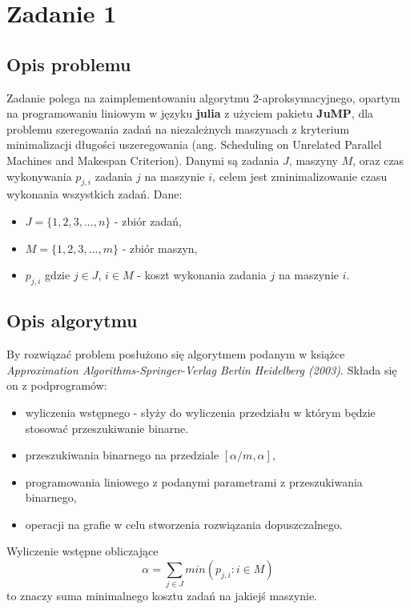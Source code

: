 \chapter{Zadanie 1}
\thispagestyle{chapterBeginStyle}
\label{rozdzial1}

\section{Opis problemu}
Zadanie polega na zaimplementowaniu algorytmu 2-aproksymacyjnego, opartym na programowaniu liniowym w języku \textbf{julia} z użyciem pakietu
\textbf{JuMP}, dla problemu szeregowania zadań na niezależnych maszynach z kryterium minimalizacji długości uszeregowania
(ang.  Scheduling on Unrelated Parallel Machines and Makespan Criterion). Danymi są 
zadania $J$, maszyny $M$, oraz czas wykonywania $p_{j,i}$ zadania $j$ na maszynie $i$, celem jest 
zminimalizowanie czasu wykonania wszystkich zadań.
Dane:
\begin{itemize}
    \item $J = \{1,2,3,...,n\}$ - zbiór zadań,
    \item $M = \{1,2,3,...,m\}$ - zbiór maszyn,
    \item $p_{j,i}$ gdzie $j \in J$, $i \in M$ - koszt wykonania zadania $j$ na maszynie $i$.
\end{itemize}

\section{Opis algorytmu}
By rozwiązać problem posłużono się algorytmem podanym w książce \textit{Approximation Algorithms-Springer-Verlag Berlin Heidelberg (2003)}.
Składa się on z podprogramów:

\begin{itemize}
    \item wyliczenia wstępnego - słyży do wyliczenia przedziału w którym będzie stosować przeszukiwanie binarne.
    \item przeszukiwania binarnego na przedziale $[\alpha / m, \alpha]$,
    \item programowania liniowego z podanymi parametrami z przeszukiwania binarnego,
    \item operacji na grafie w celu stworzenia rozwiązania dopuszczalnego.
\end{itemize}
Wyliczenie wstępne obliczające $$\alpha = \sum_{j \in J} min( p_{j,i} : i \in M) $$
to znaczy suma minimalnego kosztu zadań na jakiejś maszynie. 

